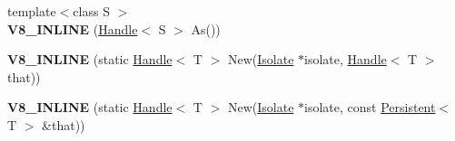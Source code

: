 \begin{DoxyCompactItemize}
\item 
\hypertarget{classv8_1_1_handle_ad78a29a0d4766f2e0e0a4d95a047efc3}{}{\footnotesize template$<$class S $>$ }\\{\bfseries V8\+\_\+\+I\+N\+L\+I\+N\+E} (\hyperlink{classv8_1_1_handle}{Handle}$<$ S $>$ As())\label{classv8_1_1_handle_ad78a29a0d4766f2e0e0a4d95a047efc3}

\item 
\hypertarget{classv8_1_1_handle_a879d31e38abe820593ffb4b665e70cc4}{}{\bfseries V8\+\_\+\+I\+N\+L\+I\+N\+E} (static \hyperlink{classv8_1_1_handle}{Handle}$<$ T $>$ New(\hyperlink{classv8_1_1_isolate}{Isolate} $\ast$isolate, \hyperlink{classv8_1_1_handle}{Handle}$<$ T $>$ that))\label{classv8_1_1_handle_a879d31e38abe820593ffb4b665e70cc4}

\item 
\hypertarget{classv8_1_1_handle_a2571d514339a8d7ca7c795a19e83e887}{}{\bfseries V8\+\_\+\+I\+N\+L\+I\+N\+E} (static \hyperlink{classv8_1_1_handle}{Handle}$<$ T $>$ New(\hyperlink{classv8_1_1_isolate}{Isolate} $\ast$isolate, const \hyperlink{classv8_1_1_persistent}{Persistent}$<$ T $>$ \&that))\label{classv8_1_1_handle_a2571d514339a8d7ca7c795a19e83e887}

\end{DoxyCompactItemize}
